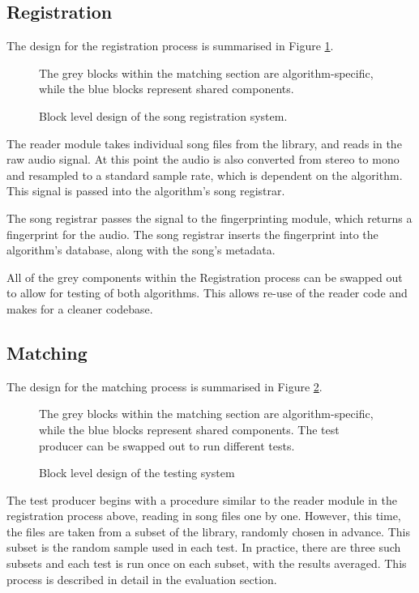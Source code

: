\documentclass[12pt,a4paper,twoside,openright]{report}
\begin{document}
\subsection{Registration}

The design for the registration process is summarised in Figure \ref{figs:registration_design}. 

\begin{figure}[h]
  \centering
  
  \caption{Block level design of the song registration system.}
  \label{figs:registration_design}
  \medskip \small
  The grey blocks within the matching section are algorithm-specific, while the blue blocks represent shared components.
\end{figure}

The reader module takes individual song files from the library, and reads in the raw audio signal. At this point the audio is also converted from stereo to mono and resampled to a standard sample rate, which is dependent on the algorithm. This signal is passed into the algorithm's song registrar.

The song registrar passes the signal to the fingerprinting module, which returns a fingerprint for the audio. The song registrar inserts the fingerprint into the algorithm's database, along with the song's metadata.

All of the grey components within the Registration process can be swapped out to allow for testing of both algorithms. This allows re-use of the reader code and makes for a cleaner codebase.



\subsection{Matching}


The design for the matching process is summarised in Figure \ref{figs:matching_design}. 

\begin{figure}[h]
  \centering
  
  \caption{Block level design of the testing system}
  \label{figs:matching_design}
  \medskip \small
  The grey blocks within the matching section are algorithm-specific, while the blue blocks represent shared components. The test producer can be swapped out to run different tests.
\end{figure}

The test producer begins with a procedure similar to the reader module in the registration process above, reading in song files one by one. However, this time, the files are taken from a subset of the library, randomly chosen in advance. This subset is the random sample used in each test. In practice, there are three such subsets and each test is run once on each subset, with the results averaged. This process is described in detail in the evaluation section.
\end{document}
